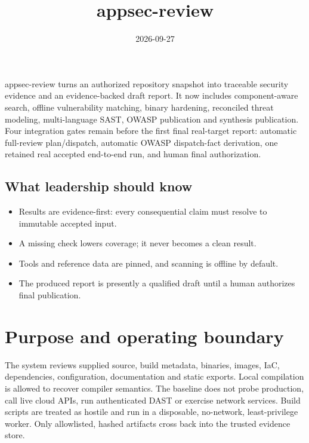 \documentclass[10pt,a4paper]{article}
\title{appsec-review}
\date{2026-09-27}
\begin{document}
\maketitle
\begin{bluf}
appsec-review turns an authorized repository snapshot into traceable security evidence and an
evidence-backed draft report. It now includes component-aware search, offline vulnerability
matching, binary hardening, reconciled threat modeling, multi-language SAST, OWASP publication and
synthesis publication. Four integration gates remain before the first final real-target report:
automatic full-review plan/dispatch, automatic OWASP dispatch-fact derivation, one retained real
accepted end-to-end run, and human final authorization.
\end{bluf}


\subsection*{What leadership should know}
\begin{itemize}
\item Results are evidence-first: every consequential claim must resolve to immutable accepted input.
\item A missing check lowers coverage; it never becomes a clean result.
\item Tools and reference data are pinned, and scanning is offline by default.
\item The produced report is presently a qualified draft until a human authorizes final publication.
\end{itemize}

\newpage
\tableofcontents

\section{Purpose and operating boundary}
The system reviews supplied source, build metadata, binaries, images, IaC, dependencies,
configuration, documentation and static exports. Local compilation is allowed to recover compiler
semantics. The baseline does not probe production, call live cloud APIs, run authenticated DAST or
exercise network services. Build scripts are treated as hostile and run in a disposable,
no-network, least-privilege worker. Only allowlisted, hashed artifacts cross back into the trusted
evidence store.
\end{document}
